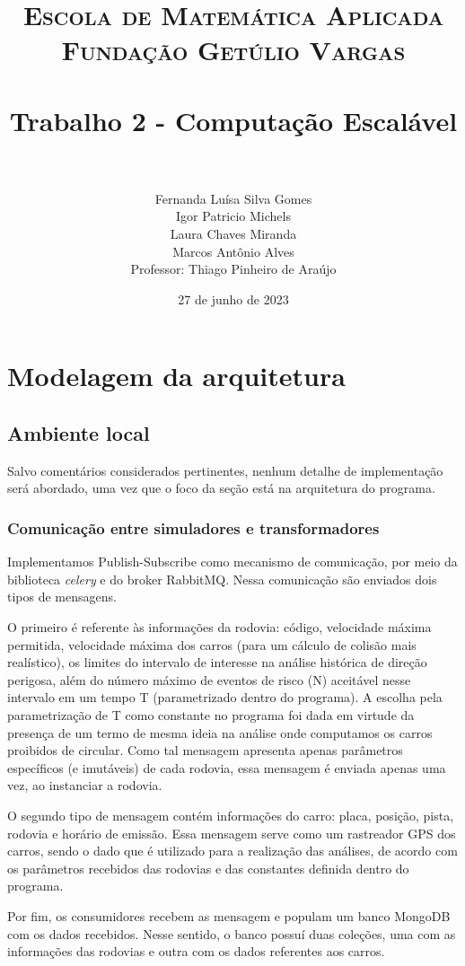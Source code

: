 \documentclass{article}
\title{	
\normalfont \normalsize 
\textsc{Escola de Matemática Aplicada} \\
\textsc{Fundação Getúlio Vargas}\\ [25pt] 
\horrule{0.5pt} \\[0.4cm]
\huge Trabalho 2 - Computação Escalável\\ 
\horrule{2pt} \\[0.5cm] 
}
\author{Fernanda Luísa Silva Gomes \\ Igor Patricio Michels \\ Laura Chaves Miranda \\ Marcos Antônio Alves \\[0.1cm]{ Professor: Thiago Pinheiro de Araújo}}
\date{27 de junho de 2023}
\begin{document}
\maketitle 
\section*{Modelagem da arquitetura}

\subsection*{Ambiente local}

Salvo comentários considerados pertinentes, nenhum detalhe de implementação será abordado, uma vez que o foco da seção está na arquitetura do programa.

\subsubsection*{Comunicação entre simuladores e transformadores}

Implementamos Publish-Subscribe como mecanismo de comunicação, por meio da biblioteca \textit{celery} e do broker RabbitMQ. Nessa comunicação são enviados dois tipos de mensagens.

O primeiro é referente às informações da rodovia: código, velocidade máxima permitida, velocidade máxima dos carros (para um cálculo de colisão mais realístico), os limites do intervalo de interesse na análise histórica de direção perigosa, além do número máximo de eventos de risco (N) aceitável nesse intervalo em um tempo T (parametrizado dentro do programa). A escolha pela parametrização de T como constante no programa foi dada em virtude da presença de um termo de mesma ideia na análise onde computamos os carros proibidos de circular. Como tal mensagem apresenta apenas parâmetros específicos (e imutáveis) de cada rodovia, essa mensagem é enviada apenas uma vez, ao instanciar a rodovia.

O segundo tipo de mensagem contém informações do carro: placa, posição, pista, rodovia e horário de emissão. Essa mensagem serve como um rastreador GPS dos carros, sendo o dado que é utilizado para a realização das análises, de acordo com os parâmetros recebidos das rodovias e das constantes definida dentro do programa.

Por fim, os consumidores recebem as mensagem e populam um banco MongoDB com os dados recebidos. Nesse sentido, o banco possuí duas coleções, uma com as informações das rodovias e outra com os dados referentes aos carros.
\end{document}
